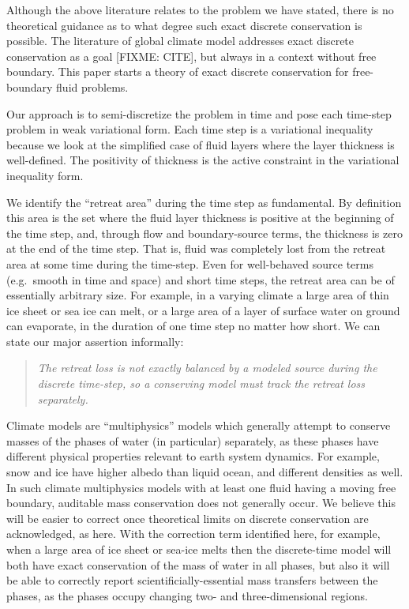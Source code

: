 \documentclass[final,leqno,onefignum,onetabnum]{siamltex1213bueler}
\begin{document}
Although the above literature relates to the problem we have stated, there is no theoretical guidance as to what degree such exact discrete conservation is possible.  The literature of global climate model addresses exact discrete conservation as a goal [FIXME: CITE], but always in a context without free boundary.  This paper starts a theory of exact discrete conservation for free-boundary fluid problems.

Our approach is to semi-discretize the problem in time and pose each time-step problem in weak variational form.  Each time step is a variational inequality because we look at the simplified case of fluid layers where the layer thickness is well-defined.  The positivity of thickness is the active constraint in the variational inequality form.

We identify the ``retreat area'' during the time step as fundamental.  By definition this area is the set where the fluid layer thickness is positive at the beginning of the time step, and, through flow and boundary-source terms, the thickness is zero at the end of the time step.  That is, fluid was completely lost from the retreat area at some time during the time-step.  Even for well-behaved source terms (e.g.~smooth in time and space) and short time steps, the retreat area can be of essentially arbitrary size.  For example, in a varying climate a large area of thin ice sheet or sea ice can melt, or a large area of a layer of surface water on ground can evaporate, in the duration of one time step no matter how short.  We can state our major assertion informally:
\begin{quote}
\emph{The retreat loss is not exactly balanced by a \emph{modeled} source during the discrete time-step, so a conserving model must track the retreat loss separately.}
\end{quote}

Climate models are ``multiphysics'' models which generally attempt to conserve masses of the phases of water (in particular) separately, as these phases have different physical properties relevant to earth system dynamics.  For example, snow and ice have higher albedo than liquid ocean, and different densities as well.  In such climate multiphysics models with at least one fluid having a moving free boundary, auditable mass conservation does not generally occur.  We believe this will be easier to correct once theoretical limits on discrete conservation are acknowledged, as here.  With the correction term identified here, for example, when a large area of ice sheet or sea-ice melts then the discrete-time model will both have exact conservation of the mass of water in all phases, but also it will be able to correctly report scientificially-essential mass transfers between the phases, as the phases occupy changing two- and three-dimensional regions.
\end{document}
